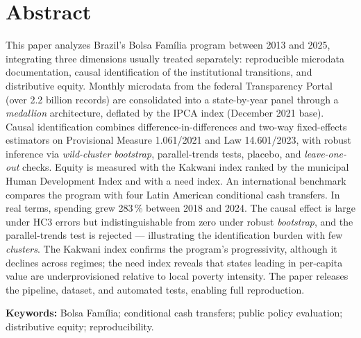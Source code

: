 \documentclass[12pt,a4paper,oneside]{article}
\begin{document}
\section*{Abstract}
\begin{singlespace}\small\noindent
This paper analyzes Brazil's Bolsa Família program between 2013 and 2025, integrating three dimensions usually treated separately: reproducible microdata documentation, causal identification of the institutional transitions, and distributive equity. Monthly microdata from the federal Transparency Portal (over 2.2 billion records) are consolidated into a state-by-year panel through a \textit{medallion} architecture, deflated by the IPCA index (December 2021 base). Causal identification combines difference-in-differences and two-way fixed-effects estimators on Provisional Measure 1.061/2021 and Law 14.601/2023, with robust inference via \textit{wild-cluster bootstrap}, parallel-trends tests, placebo, and \textit{leave-one-out} checks. Equity is measured with the Kakwani index ranked by the municipal Human Development Index and with a need index. An international benchmark compares the program with four Latin American conditional cash transfers. In real terms, spending grew 283\,\% between 2018 and 2024. The causal effect is large under HC3 errors but indistinguishable from zero under robust \textit{bootstrap}, and the parallel-trends test is rejected --- illustrating the identification burden with few \textit{clusters}. The Kakwani index confirms the program's progressivity, although it declines across regimes; the need index reveals that states leading in per-capita value are underprovisioned relative to local poverty intensity. The paper releases the pipeline, dataset, and automated tests, enabling full reproduction.

\vspace{6pt}\noindent\textbf{Keywords:} Bolsa Família; conditional cash transfers; public policy evaluation; distributive equity; reproducibility.
\end{singlespace}

\vspace{6pt}
\end{document}
